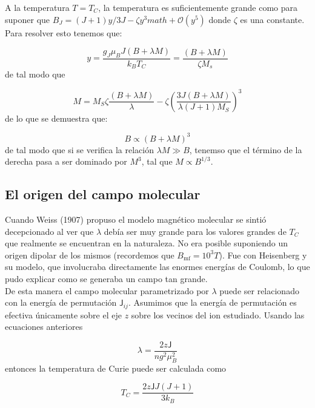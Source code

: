 \documentclass[12pt,a4paper]{book}
\numberwithin{equation}{section}
\numberwithin{figure}{section}
\newcommand{\parentesis}[1]{\left( #1  \right)}
\newcommand{\mf}{\mathrm{mf}}
\newcommand{\Jsf}{\mathsf{J}}
\begin{document}
A la temperatura $T=T_C$, la temperatura es suficientemente grande como para suponer que $B_J=(J+1)y/3J -\zeta y^3math + \mathcal{O} (y^5)$ donde $\zeta$ es una constante. Para resolver esto tenemos que:

\begin{equation}
    y = \frac{g_J \mu_B J (B+\lambda M)}{k_B T_C} = \frac{(B+\lambda M)}{\zeta M_s}
\end{equation}
de tal modo que

\begin{equation}
    M = M_S \zeta \frac{(B+\lambda M)}{\lambda} - \zeta \parentesis{\frac{3J(B+\lambda M)}{\lambda (J+1) M_S}}^3
\end{equation}
de lo que se demuestra que:

\begin{equation}
    B \varpropto (B+\lambda M)^3
\end{equation}
de tal modo que si se verifica la relación $\lambda M \gg B$, tenemso que el término de la derecha pasa a ser dominado por $M^3$, tal que $M \varpropto B^{1/3}$.


\subsection{El origen del campo molecular}

Cuando Weiss (1907) propuso el modelo magnético molecular se sintió decepcionado al ver que $\lambda$ debía ser muy grande para los valores grandes de $T_C$ que realmente se encuentran en la naturaleza. No era posible suponiendo un origen dipolar de los mismos (recordemos que $B_\mf = 10^3T$). Fue con Heisenberg y su modelo, que involucraba directamente las enormes energías de Coulomb, lo que pudo explicar como se generaba un campo tan grande. \\

De esta manera el campo molecular parametrizado por $\lambda$ puede ser relacionado con la energía de permutación $\Jsf_{ij}$. Asumimos que la energía de permutación es efectiva únicamente sobre el eje $z$ sobre los vecinos del ion estudiado. Usando las ecuaciones anteriores 

\begin{equation}
    \lambda = \frac{2z\Jsf}{n g^2 \mu_B^2} \label{Ec:05-01-014}
\end{equation}
entonces la temperatura de Curie puede ser calculada como

\begin{equation}
    T_C = \frac{2z \Jsf J(J+1)}{3k_B}
\end{equation}
\end{document}
